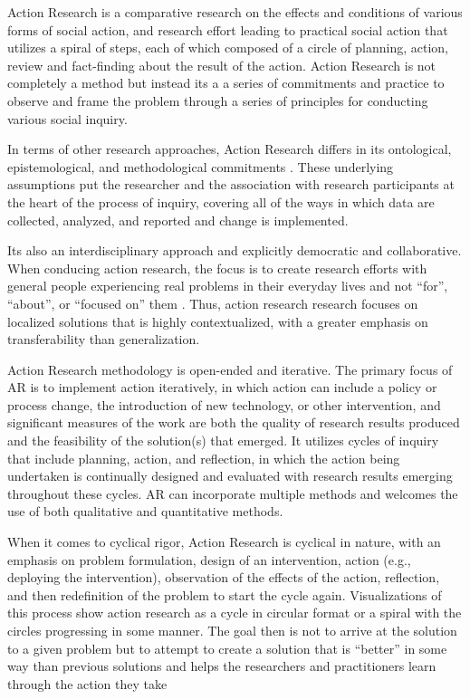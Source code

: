 Action Research is a comparative research on the effects and conditions of various forms of social action, and research effort leading to practical social action that utilizes a spiral of steps, each of which composed of a circle of planning, action, review and fact-finding about the result of the action\cite{Hayes:2011:RAR:1993060.1993065}. Action Research is not completely a method but instead its a a series of commitments and practice to observe and frame the problem through a series of principles for conducting various social inquiry.

In terms of other research approaches, Action Research differs in its ontological, epistemological, and methodological commitments \cite{edsjsr.312187519970101}. These underlying assumptions put the researcher and the association with research participants at the heart of the process of inquiry, covering all of the ways in which data are collected, analyzed, and reported and change is implemented.

Its also an interdisciplinary approach and explicitly democratic and collaborative. When conducing action research, the focus is to create research efforts with general people experiencing real problems in their everyday lives and not “for”, “about”, or “focused on” them \cite{Hayes:2011:RAR:1993060.1993065}. Thus, action research research focuses on localized solutions that is highly contextualized, with a greater emphasis on transferability than generalization. 

Action Research methodology is open-ended and iterative. The primary focus of AR is to implement action iteratively, in which action can include a policy or process change, the introduction of new technology, or other intervention, and significant measures of the work are both the quality of research results produced and the feasibility of the solution(s) that emerged. It utilizes cycles of inquiry that include planning, action, and reflection, in which the action being undertaken is continually designed and evaluated with research results emerging throughout these cycles. AR can incorporate multiple methods and welcomes the use of both qualitative and quantitative methods.

When it comes to cyclical rigor, Action Research is cyclical in nature, with an emphasis on problem formulation, design of an intervention, action (e.g., deploying the intervention), observation of the effects of the action, reflection, and then redefinition of the problem to start the cycle again. Visualizations of this process show action research as a cycle in circular format or a spiral with the circles progressing in some manner. The goal then is not to arrive at the solution to a given problem but to attempt to create a solution that is “better” in some way than previous solutions and helps the researchers and practitioners learn through the action they take

